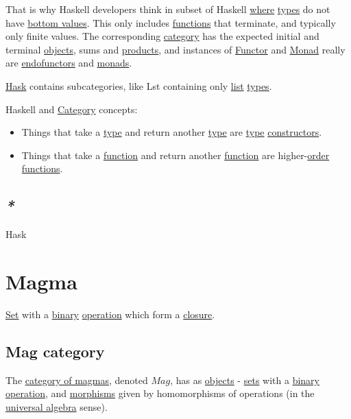 \documentclass[a4paper,14pt,oneside]{book}
\begin{document}
That is why Haskell developers think in subset of Haskell \hyperref[org6c63c7a]{where} \hyperref[orge9a3a14]{types} do not have \hyperref[org20a63fb]{bottom values}. This only includes \hyperref[org934327c]{functions} that terminate, and typically only finite values. The corresponding \hyperref[orge2e250a]{category} has the expected initial and terminal \hyperref[orgde02dc0]{objects}, sums and \hyperref[org132a605]{products}, and instances of \hyperref[org61d5270]{Functor} and \hyperref[orged38b8b]{Monad} really are \hyperref[orgc9d7639]{endofunctors} and \hyperref[org4adc35b]{monads}.

\hyperref[org70e1f79]{Hask} contains subcategories, like Lst containing only \hyperref[orgab36b30]{list} \hyperref[orge9a3a14]{types}.

Haskell and \hyperref[orge2e250a]{Category} concepts:
\begin{itemize}
\item Things that take a \hyperref[org1eff537]{type} and return another \hyperref[org1eff537]{type} are \hyperref[org1eff537]{type} \hyperref[org40e6ba1]{constructors}.
\item Things that take a \hyperref[org679af45]{function} and return another \hyperref[org679af45]{function} are higher-\hyperref[orgd479a8c]{order} \hyperref[org934327c]{functions}.
\end{itemize}

\subsection{\emph{*}}
\label{sec:orgcbe02fd}

\label{org70e1f79}Hask

\section{\label{org6f5545b}Magma}
\label{sec:org3b8f165}
\hyperref[org128a409]{Set} with a \hyperref[orgb210b36]{binary} \hyperref[orgf147542]{operation} which form a \hyperref[org7b0cc65]{closure}.

\subsection{\label{org18ceba0}Mag category}
\label{sec:org396207f}
The \hyperref[org1a174d8]{category of magmas}, denoted \(Mag\), has as \hyperref[orgde02dc0]{objects} - \hyperref[orgfcb3af7]{sets} with a \hyperref[orgb210b36]{binary} \hyperref[orgf147542]{operation}, and \hyperref[org46b4110]{morphisms} given by homomorphisms of operations (in the \hyperref[org8d922c6]{universal algebra} sense).
\end{document}
